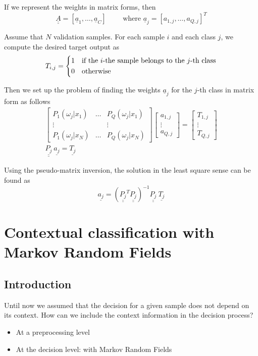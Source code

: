 \documentclass[oneside,onecolumn]{report}
\begin{document}
If we represent the weights in matrix forms, then
$$ \underline{\underline{A}} = \left[ \underline a_1, \dots, \underline a_C \right] \qquad \text{ where } \underline a_j = \left[ a_{1, j}, \dots, a_{Q, j} \right]^T $$

Assume that $N$ validation samples.
For each sample $i$ and each class $j$, we compute the desired target output as
$$ T_{i, j} = \begin{dcases}
    1 & \text{if the $i$-the sample belongs to the $j$-th class} \\
    0 & \text{otherwise}
\end{dcases} $$

Then we set up the problem of finding the weights $\underline a_j$ for the $j$-th class in matrix form as follows
\begin{gather*}
    \begin{bmatrix}
        P_1(\omega_j | x_1) & \dots & P_Q(\omega_j | x_1) \\
        \vdots &  & \vdots \\
        P_1(\omega_j | x_N) & \dots & P_Q(\omega_j | x_N)
    \end{bmatrix}
    \begin{bmatrix}
        a_{1, j} \\
        \vdots \\
        a_{Q, j}
    \end{bmatrix}
    =
    \begin{bmatrix}
        T_{1, j} \\
        \vdots \\
        T_{Q, j}
    \end{bmatrix} \\
    \underline{\underline{P_j}}
    \ \underline{a_j}
    =
    \underline{T_j}
\end{gather*}

Using the pseudo-matrix inversion, the solution in the least square sense can be found as
$$ \underline{a_j} = \left( \underline{\underline{P_j}}^T \underline{\underline{P_j}} \right)^{-1} \underline{\underline{P_j}} \ \underline{T_j} $$




\section{Contextual classification with Markov Random Fields}
\subsection{Introduction}
Until now we assumed that the decision for a given sample does not depend on its context.
How can we include the context information in the decision process?
\begin{itemize}
    \item At a preprocessing level
    \item At the decision level: with Markov Random Fields
\end{itemize}
\end{document}
